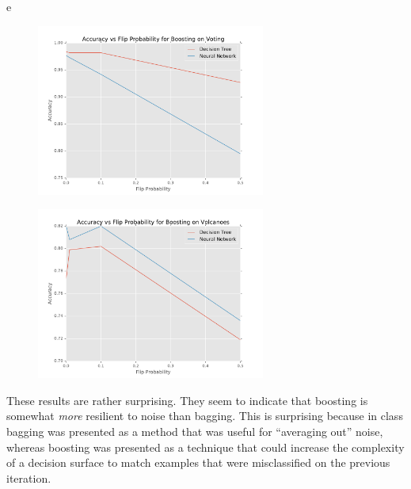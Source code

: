\documentclass[fleqn]{homework}
\begin{document}
\begin{problem}{e}
    \begin{figure}[h!]
      \centering
      \caption{}
      \label{f:e-voting}
      \includegraphics[width=0.67\textwidth]{e-voting.pdf}
    \end{figure}
    \begin{figure}[h!]
      \centering
      \caption{}
      \label{f:e-volcanoes}
      \includegraphics[width=0.67\textwidth]{e-volcanoes.pdf}
    \end{figure}

    These results are rather surprising.  They seem to indicate that boosting is
    somewhat \textit{more} resilient to noise than bagging.  This is surprising
    because in class bagging was presented as a method that was useful for
    ``averaging out'' noise, whereas boosting was presented as a technique that
    could increase the complexity of a decision surface to match examples that
    were misclassified on the previous iteration.
  \end{problem}
\end{document}
